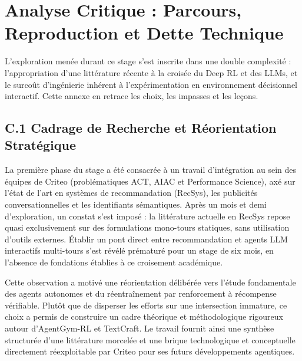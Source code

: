 \documentclass[11pt,a4paper]{article}
\begin{document}
\newpage
\section{Analyse Critique : Parcours, Reproduction et Dette Technique}
\label{sec:annexe_critique}

L'exploration menée durant ce stage s'est inscrite dans une double complexité : l'appropriation d'une littérature récente à la croisée du Deep RL et des LLMs, et le surcoût d'ingénierie inhérent à l'expérimentation en environnement décisionnel interactif. Cette annexe en retrace les choix, les impasses et les leçons.

\subsection*{C.1 Cadrage de Recherche et Réorientation Stratégique}
La première phase du stage a été consacrée à un travail d'intégration au sein des équipes de Criteo (problématiques ACT, AIAC et Performance Science), axé sur l'état de l'art en systèmes de recommandation (RecSys), les publicités conversationnelles et les identifiants sémantiques. Après un mois et demi d'exploration, un constat s'est imposé : la littérature actuelle en RecSys repose quasi exclusivement sur des formulations mono-tours statiques, sans utilisation d'outils externes. Établir un pont direct entre recommandation et agents LLM interactifs multi-tours s'est révélé prématuré pour un stage de six mois, en l'absence de fondations établies à ce croisement académique.

Cette observation a motivé une réorientation délibérée vers l'étude fondamentale des agents autonomes et du réentraînement par renforcement à récompense vérifiable. Plutôt que de disperser les efforts sur une intersection immature, ce choix a permis de construire un cadre théorique et méthodologique rigoureux autour d'AgentGym-RL et TextCraft. Le travail fournit ainsi une synthèse structurée d'une littérature morcelée et une brique technologique et conceptuelle directement réexploitable par Criteo pour ses futurs développements agentiques.
\end{document}
